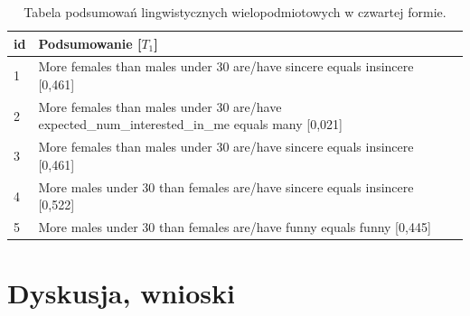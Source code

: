 \documentclass{classrep}
\begin{document}
\begin{center}
  \begin{table}[H]
    \begin{tabularx}{\textwidth}{lXc}
    
    id & Podsumowanie [$T_1$] \\ \hline 
  
    1 & More females than males under 30 are/have sincere equals insincere [0,461] \\\hline
    2 & More females than males under 30 are/have expected\_num\_interested\_in\_me equals many [0,021] \\  \hline
    3 & More females than males under 30 are/have sincere equals insincere [0,461]\\ \hline
    4 & More males under 30 than females are/have sincere equals insincere [0,522]\\ \hline
    5 & More males under 30 than females are/have funny equals funny [0,445]\\ \hline
  \end{tabularx}
  \caption{Tabela podsumowań lingwistycznych wielopodmiotowych w czwartej formie.}
\end{table}
\end{center}





% 
% 
% 

\section{Dyskusja, wnioski}
\end{document}
